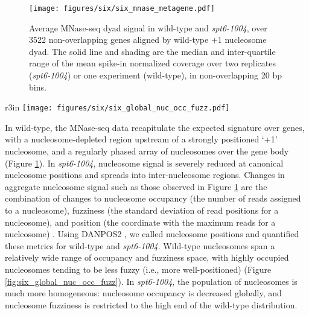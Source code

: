 \begin{figure}[h]
    \centering
    \texttt{[image: figures/six/six\_mnase\_metagene.pdf]}
    \caption[Average MNase-seq dyad signal in wild-type and \textit{spt6-1004}, over non-overlapping genes aligned by wild-type +1 nucleosome dyad.]{Average MNase-seq dyad signal in wild-type and \textit{spt6-1004}, over 3522 non-overlapping genes aligned by wild-type +1 nucleosome dyad. The solid line and shading are the median and inter-quartile range of the mean spike-in normalized coverage over two replicates (\textit{spt6-1004}) or one experiment (wild-type), in non-overlapping 20 bp bins.}
    \label{fig:six_mnase_metagene}
\end{figure}

\begin{wrapfigure}[11]{r}{3in}
    \centering
    \texttt{[image: figures/six/six\_global\_nuc\_occ\_fuzz.pdf]}
    \caption[Contour plot of nucleosome occupancy and fuzziness in wild-type and \textit{spt6-1004}.]{Contour plot of the distribution of nucleosome occupancy and fuzziness in wild-type and \textit{spt6-1004}. Dashed lines indicate median values.}
    \label{fig:six_global_nuc_occ_fuzz}
\end{wrapfigure}
In wild-type, the MNase-seq data recapitulate the expected signature over genes, with a nucleosome-depleted region upstream of a strongly positioned `+1' nucleosome, and a regularly phased array of nucleosomes over the gene body (Figure \ref{fig:six_mnase_metagene}).
In \textit{spt6-1004}, nucleosome signal is severely reduced at canonical nucleosome positions and spreads into inter-nucleosome regions.
Changes in aggregate nucleosome signal such as those observed in Figure \ref{fig:six_mnase_metagene} are the combination of changes to nucleosome occupancy (the number of reads assigned to a nucleosome), fuzziness (the standard deviation of read positions for a nucleosome), and position (the coordinate with the maximum reads for a nucleosome) \citep{chen2013}.
Using DANPOS2 \citep{chen2013}, we called nucleosome positions and quantified these metrics for wild-type and \textit{spt6-1004}.
Wild-type nucleosomes span a relatively wide range of occupancy and fuzziness space, with highly occupied nucleosomes tending to be less fuzzy (i.e., more well-positioned) (Figure \ref{fig:six_global_nuc_occ_fuzz}).
In \textit{spt6-1004}, the population of nucleosomes is much more homogeneous: nucleosome occupancy is decreased globally, and nucleosome fuzziness is restricted to the high end of the wild-type distribution.

